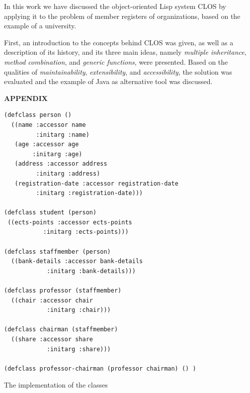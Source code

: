 \documentclass[oribibl]{llncs}
\begin{document}
In this work we have discussed the object-oriented Lisp system CLOS by applying it to the problem of member registers of organizations, based on the example of a university. 

First, an introduction to the concepts behind CLOS was given, as well as a description of its history, and its three main ideas, namely \emph{multiple inheritance}, \emph{method combination}, and \emph{generic functions}, were presented. Based on the qualities of \emph{maintainability}, \emph{extensibility}, and \emph{accessibility}, the solution was evaluated and the example of Java as alternative tool was discussed.

\newpage
\nocite{*}



\newpage
    \begin{center}
      {\bf APPENDIX}
    \end{center}
\label{sec:appendix}

\begin{listing}[]%
\begin{verbatim}
(defclass person ()
  ((name :accessor name
         :initarg :name)
   (age :accessor age
        :initarg :age)
   (address :accessor address
         :initarg :address)
   (registration-date :accessor registration-date
         :initarg :registration-date)))

(defclass student (person)
 ((ects-points :accessor ects-points
           :initarg :ects-points)))

(defclass staffmember (person)
  ((bank-details :accessor bank-details
            :initarg :bank-details)))

(defclass professor (staffmember)
  ((chair :accessor chair
            :initarg :chair)))

(defclass chairman (staffmember)
  ((share :accessor share
            :initarg :share)))

(defclass professor-chairman (professor chairman) () )
\end{verbatim}
\caption{The implementation of the classes}
\label{lst:entire-implementation}
\end{listing}
\end{document}
